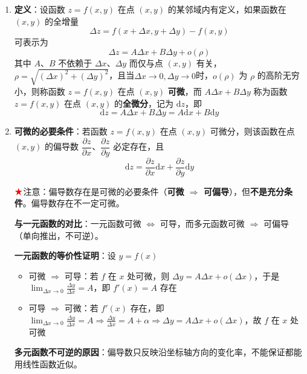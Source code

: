 \documentclass[../book.tex]{subfiles}
\begin{document}
    \begin{enumerate}
        \item \textbf{定义}：设函数 $z = f(x,y)$ 在点 $(x, y)$ 的某邻域内有定义，如果函数在 $(x, y)$ 的全增量
        \[
            \Delta z = f(x + \Delta x, y + \Delta y) - f(x, y)
        \]
        可表示为
        \[
            \Delta z = A\Delta x + B\Delta y + o(\rho)
        \]
        其中 $A$、$B$ 不依赖于 $\Delta x$、$\Delta y$ 而仅与点 $(x, y)$ 有关，$\rho = \sqrt{(\Delta x)^2 + (\Delta y)^2}$，且当$\Delta x \to 0, \Delta y \to 0$时，$o(\rho)$ 为 $\rho$ 的高阶无穷小，则称函数 $z = f(x,y)$ 在点 $(x, y)$ \textbf{可微}，而 $A\Delta x + B\Delta y$ 称为函数 $z = f(x,y)$ 在点 $(x, y)$ 的\textbf{全微分}，记为 $\mathrm{d}z$，即
        \[
            \mathrm{d}z = A\Delta x + B\Delta y = A\mathrm{d}x + B\mathrm{d}y
        \]

        \item \textbf{可微的必要条件}：若函数 $z = f(x,y)$ 在点 $(x,y)$ 可微分，则该函数在点 $(x,y)$ 的偏导数 $\dfrac{\partial z}{\partial x}$、$\dfrac{\partial z}{\partial y}$ 必定存在，且
        \[
            \mathrm{d}z = \frac{\partial z}{\partial x}\mathrm{d}x + \frac{\partial z}{\partial y}\mathrm{d}y
        \]

        $\color{red}{\bigstar}$注意：偏导数存在是可微的必要条件（\textbf{可微 $\Rightarrow$ 可偏导}），但\textbf{不是充分条件}。偏导数存在不一定可微。

        \textbf{与一元函数的对比}：一元函数可微 $\Leftrightarrow$ 可导，而多元函数可微 $\Rightarrow$ 可偏导（单向推出，不可逆）。

        \textbf{一元函数的等价性证明}：设 $y = f(x)$
        \begin{itemize}
            \item 可微 $\Rightarrow$ 可导：若 $f$ 在 $x$ 处可微，则 $\Delta y = A\Delta x + o(\Delta x)$，于是 $\displaystyle\lim_{\Delta x \to 0} \frac{\Delta y}{\Delta x} = A$，即 $f'(x) = A$ 存在
            \item 可导 $\Rightarrow$ 可微：若 $f'(x)$ 存在，即$\displaystyle\lim_{\Delta x \to 0} \frac{\Delta y}{\Delta x} = A \Rightarrow \frac{\Delta y}{\Delta x} = A + \alpha \Rightarrow \Delta y = A\Delta x + o(\Delta x) $，故 $f$ 在 $x$ 处可微
        \end{itemize}

        \textbf{多元函数不可逆的原因}：偏导数只反映沿坐标轴方向的变化率，不能保证{\color{red}{沿任意方向}}都能用线性函数近似。


\end{enumerate}
\end{document}
